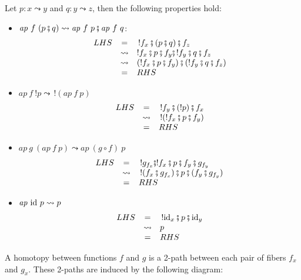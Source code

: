 \documentclass[11pt]{article}
\newcommand{\cp}{\circ}                 %
\newcommand{\pc}{\fatsemi}                 %
\newcommand{\id}{\textrm{\rm id}}       %
\renewcommand{\path}{\leadsto}
\newcommand{\ap}[2]{\mathit{ap}~#1~#2}
\begin{document}
Let $p : x \path y$ and $q : y \path z$, then the following properties 
hold:
\begin{itemize}
\item $\ap{f}{(p \pc q)} \path \ap{f}{p} \pc \ap{f}{q}$:
\[\begin{array}{rcl}
LHS &=& \, !f_x \pc (p \pc q) \pc f_z \\
    &\path& ! f_x \pc p \pc f_y \pc \, ! f_y \pc q \pc f_z \\
    &\path& (! f_x \pc p \pc f_y) \pc (! f_y \pc q \pc f_z) \\
    &=& RHS
\end{array}\]
\item $\ap{f}{!p} \path \, !(\ap{f}{p})$
\[\begin{array}{rcl}
LHS &=& \, !f_y \pc (!p) \pc f_x \\
    &\path& \, !(!f_x \pc p \pc f_y) \\
    &=& RHS
\end{array}\]
\item $\ap{g}{(\ap{f}{p})} \path \ap{(g \cp f)}{p}$
\[\begin{array}{rcl}
LHS &=& \, !g_{f_x} \pc !f_x \pc p \pc f_y \pc g_{f_y} \\
    &\path& \, ! (f_x \pc g_{f_x}) \pc p \pc (f_y \pc g_{f_y}) \\
    &=& RHS
\end{array}\]
\item $\ap{\id}{p} \path p$
\[\begin{array}{rcl}
LHS &=& \, !\id_x \pc p \pc \id_y \\
    &\path& p \\
    &=& RHS
\end{array}\]
\end{itemize}

A homotopy between functions $f$ and $g$ is a 2-path between each pair of
fibers $f_x$ and $g_x$. These 2-paths are induced by the following diagram:

\begin{center}
\end{center}
\end{document}
